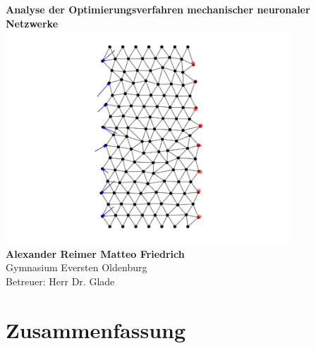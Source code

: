 \documentclass[10pt]{scrartcl}
\begin{document}
\thispagestyle{empty}

\vspace*{10mm}
\begin{center}
    {\Huge \textbf{\sansemph Analyse der Optimierungsverfahren mechanischer neuronaler Netzwerke}}%
    \\[4mm]
    \includegraphics[width=0.8\textwidth]{bilder/test2.pdf} \\[4mm]
    {\huge \textbf{Alexander Reimer \qquad Matteo Friedrich}} \\[1em]
    {\LARGE {Gymnasium Eversten Oldenburg}} \\[1.2ex]
    {\LARGE {Betreuer: Herr Dr. Glade}}
\end{center}

\newpage

\tableofcontents

\section*{Zusammenfassung}
\end{document}

